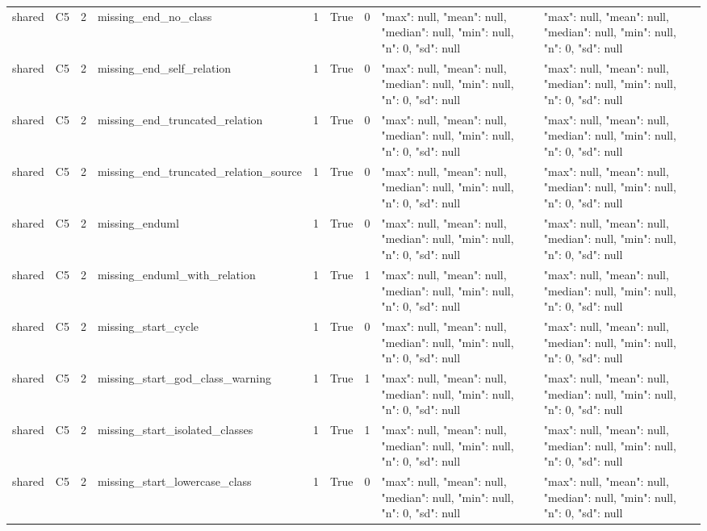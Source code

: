 \begin{tabular}{lllllllll}
shared & C5 & 2 & missing\_end\_no\_class & 1 & True & 0 & {"max": null, "mean": null, "median": null, "min": null, "n": 0, "sd": null} & {"max": null, "mean": null, "median": null, "min": null, "n": 0, "sd": null} \\
shared & C5 & 2 & missing\_end\_self\_relation & 1 & True & 0 & {"max": null, "mean": null, "median": null, "min": null, "n": 0, "sd": null} & {"max": null, "mean": null, "median": null, "min": null, "n": 0, "sd": null} \\
shared & C5 & 2 & missing\_end\_truncated\_relation & 1 & True & 0 & {"max": null, "mean": null, "median": null, "min": null, "n": 0, "sd": null} & {"max": null, "mean": null, "median": null, "min": null, "n": 0, "sd": null} \\
shared & C5 & 2 & missing\_end\_truncated\_relation\_source & 1 & True & 0 & {"max": null, "mean": null, "median": null, "min": null, "n": 0, "sd": null} & {"max": null, "mean": null, "median": null, "min": null, "n": 0, "sd": null} \\
shared & C5 & 2 & missing\_enduml & 1 & True & 0 & {"max": null, "mean": null, "median": null, "min": null, "n": 0, "sd": null} & {"max": null, "mean": null, "median": null, "min": null, "n": 0, "sd": null} \\
shared & C5 & 2 & missing\_enduml\_with\_relation & 1 & True & 1 & {"max": null, "mean": null, "median": null, "min": null, "n": 0, "sd": null} & {"max": null, "mean": null, "median": null, "min": null, "n": 0, "sd": null} \\
shared & C5 & 2 & missing\_start\_cycle & 1 & True & 0 & {"max": null, "mean": null, "median": null, "min": null, "n": 0, "sd": null} & {"max": null, "mean": null, "median": null, "min": null, "n": 0, "sd": null} \\
shared & C5 & 2 & missing\_start\_god\_class\_warning & 1 & True & 1 & {"max": null, "mean": null, "median": null, "min": null, "n": 0, "sd": null} & {"max": null, "mean": null, "median": null, "min": null, "n": 0, "sd": null} \\
shared & C5 & 2 & missing\_start\_isolated\_classes & 1 & True & 1 & {"max": null, "mean": null, "median": null, "min": null, "n": 0, "sd": null} & {"max": null, "mean": null, "median": null, "min": null, "n": 0, "sd": null} \\
shared & C5 & 2 & missing\_start\_lowercase\_class & 1 & True & 0 & {"max": null, "mean": null, "median": null, "min": null, "n": 0, "sd": null} & {"max": null, "mean": null, "median": null, "min": null, "n": 0, "sd": null} \\

\end{tabular}
